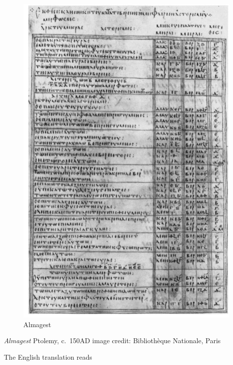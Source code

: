 \documentclass[
  letterpaper,
  DIV=11,
  numbers=noendperiod]{scrartcl}
\begin{document}
\begin{figure}

{\centering \includegraphics{img/Almagest.png}

}

\caption{Almagest}

\end{figure}

\emph{Almagest} Ptolemy, c.~150AD image credit: Bibliothèque Nationale,
Paris

The English translation reads
\end{document}

